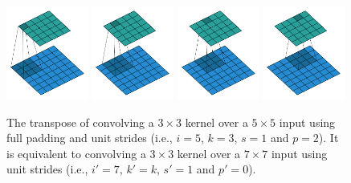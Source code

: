 \begin{figure}[p]
    \centering
    \includegraphics[width=0.24\textwidth]{pdf/full_padding_no_strides_transposed_00.pdf}
    \includegraphics[width=0.24\textwidth]{pdf/full_padding_no_strides_transposed_01.pdf}
    \includegraphics[width=0.24\textwidth]{pdf/full_padding_no_strides_transposed_02.pdf}
    \includegraphics[width=0.24\textwidth]{pdf/full_padding_no_strides_transposed_03.pdf}
    \caption{\label{fig:full_padding_no_strides_transposed} The transpose of
        convolving a $3 \times 3$ kernel over a $5 \times 5$ input using full
        padding and unit strides (i.e., $i = 5$, $k = 3$, $s = 1$ and $p = 2$).
        It is equivalent to convolving a $3 \times 3$ kernel over a $7 \times 7$
        input using unit strides (i.e., $i' = 7$, $k' = k$, $s' = 1$ and $p' =
        0$).}
\end{figure}

